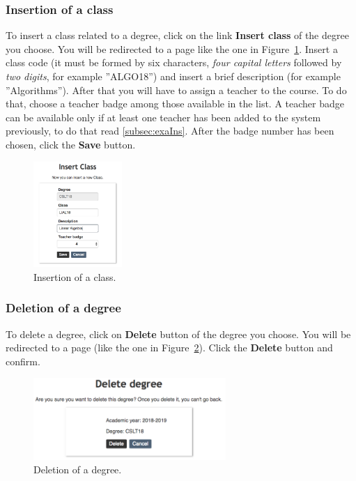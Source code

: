\subsubsection{Insertion of a class} \label{sssec:clsIns}
To insert a class related to a degree, click on the link \textbf{Insert class} of the degree you choose. You will be redirected to a page like the one in Figure~\ref{fig:insertDidacticActivity}. Insert a class code (it must be formed by six characters, \emph{four capital letters} followed by \emph{two digits}, for example ''ALGO18'') and insert a brief description (for example ''Algorithms''). After that you will have to assign a teacher to the course. To do that, choose a teacher badge among those available in the list. A teacher badge can be available only if at least one teacher has been added to the system previously, to do that read \ref{subsec:exaIns}. After the badge number has been chosen, click the \textbf{Save} button.%
\begin{figure}[H]
  \centering
  \includegraphics[width=0.30\textwidth]{img/insertDidacticActivity.png}
  \caption{Insertion of a class.}
  \label{fig:insertDidacticActivity}
\end{figure}

\subsubsection{Deletion of a degree}
To delete a degree, click on \textbf{Delete} button of the degree you choose. You will be redirected to a page (like the one in Figure~\ref{fig:deleteDegree}). Click the \textbf{Delete} button and confirm.%
\begin{figure}[H]
  \centering
  \includegraphics[width=0.65\textwidth]{img/deleteDegree.png}
  \caption{Deletion of a degree.}
  \label{fig:deleteDegree}
\end{figure}

